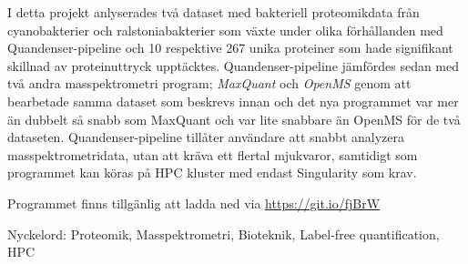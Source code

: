 I detta projekt anlyserades två dataset med bakteriell proteomikdata från cyanobakterier och ralstoniabakterier som växte under olika förhållanden med Quandenser-pipeline och 10 respektive 267 unika proteiner som hade signifikant skillnad av proteinuttryck upptäcktes. Quandenser-pipeline jämfördes sedan med två andra masspektrometri program; \textit{MaxQuant} och \textit{OpenMS} genom att bearbetade samma dataset som beskrevs innan och det nya programmet var mer än dubbelt så snabb som MaxQuant och var lite snabbare än OpenMS för de två dataseten. Quandenser-pipeline tillåter användare att snabbt analyzera masspektrometridata, utan att kräva ett flertal mjukvaror, samtidigt som programmet kan köras på HPC kluster med endast Singularity som krav.

Programmet finns tillgänlig att ladda ned via \url{https://git.io/fjBrW}

\vspace{2cm}

Nyckelord: Proteomik, Masspektrometri, Bioteknik, Label-free quantification, HPC
